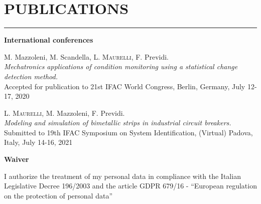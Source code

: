 \documentclass[10pt]{article}
\newcommand{\cvsection}[1]{\section*{\centering\normalsize\uppercase{#1}}\vspace{-16pt}\rule{\linewidth}{0.2pt}\vspace{6pt}}
\begin{document}

\cvsection{publications}

\textbf{International conferences}
\begin{enumerate}[label={[C0{\arabic*}]}]
	\setlength\itemsep{-3pt}
	\item M. Mazzoleni, M. Scandella, \textsc{L. Maurelli}, F. Previdi.\\
	\textit{Mechatronics applications of condition monitoring using a statistical change detection method.}\\
	Accepted for publication to 21st IFAC World Congress, Berlin, Germany, July 12-17, 2020
	\item \textsc{L. Maurelli}, M. Mazzoleni, F. Previdi.\\
	\textit{Modeling and simulation of bimetallic strips in industrial circuit breakers.}\\
	Submitted to 19th IFAC Symposium on System Identification, (Virtual) Padova, Italy, July 14-16, 2021
\end{enumerate}


\vfill
{\centering \textbf{Waiver} \par}
I authorize the treatment of my personal data in compliance with the Italian Legislative Decree 196/2003 and the article GDPR 679/16 - “European regulation on the protection of personal data”
\end{document}
